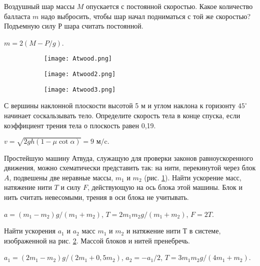 \begin{ex} %
Воздушный шар массы $M$ опускается с постоянной скоростью. Какое количество балласта $m$ надо выбросить, чтобы шар начал подниматься с той же скоростью? Подъемную силу $Р$ шара считать постоянной.
\begin{ans}
$m = 2(M - P/g)$.
\end{ans}
\end{ex}

\begin{figure}[h]
\centering
\begin{subfigure}[t]{.3\textwidth}
  \centering
  \texttt{[image: Atwood.png]}
  \caption{}
  \label{Atwood}
\end{subfigure}
\begin{subfigure}[t]{.3\textwidth}
  \centering
  \texttt{[image: Atwood2.png]}
  \caption{}
  \label{Atwood2}
\end{subfigure}
\begin{subfigure}[t]{.3\textwidth}
  \centering
  \texttt{[image: Atwood3.png]}
  \caption{}
  \label{Atwood3}
\end{subfigure}
\caption{}
\end{figure}

\begin{ex}
С вершины наклонной плоскости высотой 5 м и углом наклона к горизонту $45^{\circ}$ начинает соскальзывать тело. Определите скорость тела в конце спуска, если коэффициент трения тела  о плоскость равен 0,19.
\begin{ans}
$ v = \sqrt{2gh(1 - \mu \cot \alpha)} = 9 \textrm{ м/c}.$
\end{ans}
\end{ex}

\begin{ex} %
Простейшую машину Атвуда, служащую для проверки законов равноускоренного движения, можно схематически представить так: на нити, перекинутой через блок $A$, подвешены две неравные массы, $m_1$
и $m_2$ (рис. \ref{Atwood}). Найти ускорение масс, натяжение нити $T$ и силу $F$, действующую на ось блока этой машины. Блок и нить считать невесомыми, трения в оси блока не учитывать.
\begin{ans}
$a = (m_1 - m_2)g / (m_1 + m_2)$, $T = 2 m_1 m_2 g /(m_1 + m_2)$, $F = 2T$.
\end{ans}
\end{ex}

\begin{ex} %
Найти ускорения $a_1$ и $a_2$ масс $m_1$ и $m_2$ и натяжение нити $Т$ в системе, изображенной на рис. \ref{Atwood2}. Массой блоков и нитей пренебречь.
\begin{ans}
$a_1 = (2m_1-m_2)g/(2m_1+0,5m_2)$, $a_2 = -a_1/2$, $T=3m_1 m_2g/(4m_1 + m_2)$.
\end{ans}
\end{ex}

